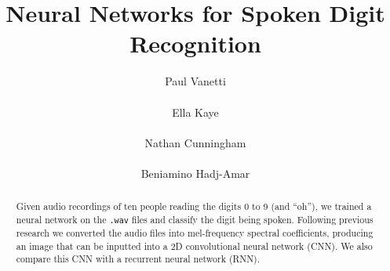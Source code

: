 \documentclass{article} %
\title{Neural Networks for Spoken Digit Recognition}
\author{
Paul Vanetti \\
\texttt{} \\
\And
Ella Kaye \\
\texttt{} \\
\And
Nathan Cunningham \\
\texttt{} \\
\And
Beniamino Hadj-Amar \\
\texttt{}
}
\begin{document}
\maketitle

\begin{abstract}
Given audio recordings of ten people reading the digits 0 to 9 (and ``oh''), we trained a neural network on the \texttt{.wav} files and classify the digit being spoken. Following previous research we converted the audio files into mel-frequency spectral coefficients, producing an image that can be inputted into a 2D convolutional neural network (CNN). We also compare this CNN with a recurrent neural network (RNN).
\end{abstract}








% 



\small{

}
\end{document}
